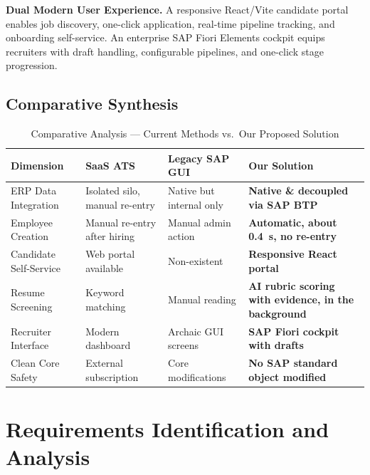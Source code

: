 \textbf{Dual Modern User Experience.} A responsive React/Vite candidate portal enables job discovery, one-click application, real-time pipeline tracking, and onboarding self-service. An enterprise SAP Fiori Elements cockpit equips recruiters with draft handling, configurable pipelines, and one-click stage progression.

\subsection{Comparative Synthesis}
\label{subsec:comparative_synthesis}

\begin{table}[H]
\centering
\caption{Comparative Analysis --- Current Methods vs.\ Our Proposed Solution}
\label{tab:comparative_synthesis}
\renewcommand{\arraystretch}{1.4}
\small
\begin{tabular}{|>{\raggedright\arraybackslash}p{3.5cm}|>{\raggedright\arraybackslash}p{3cm}|>{\raggedright\arraybackslash}p{3cm}|>{\raggedright\arraybackslash}p{4.2cm}|}
\hline
\textbf{Dimension} & \textbf{SaaS ATS} & \textbf{Legacy SAP GUI} & \textbf{Our Solution} \\
\hline
ERP Data Integration & Isolated silo, manual re-entry & Native but internal only & \textbf{Native \& decoupled via SAP BTP} \\
\hline
Employee Creation & Manual re-entry after hiring & Manual admin action & \textbf{Automatic, about 0.4~s, no re-entry} \\
\hline
Candidate Self-Service & Web portal available & Non-existent & \textbf{Responsive React portal} \\
\hline
Resume Screening & Keyword matching & Manual reading & \textbf{AI rubric scoring with evidence, in the background} \\
\hline
Recruiter Interface & Modern dashboard & Archaic GUI screens & \textbf{SAP Fiori cockpit with drafts} \\
\hline
Clean Core Safety & External subscription & Core modifications & \textbf{No SAP standard object modified} \\
\hline
\end{tabular}
\end{table}

\newpage

\section{Requirements Identification and Analysis}
\label{sec:requirements_analysis}


